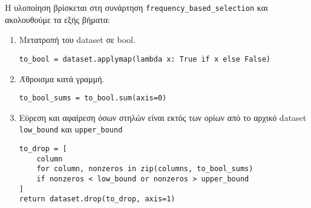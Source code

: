 Η υλοποίηση βρίσκεται στη συνάρτηση \lstinline!frequency_based_selection! και ακολουθούμε τα εξής βήματα:
\begin{enumerate}
\item Μετατροπή του dataset σε bool.
\begin{lstlisting}[numbers=none, aboveskip=\smallskipamount, belowskip=\smallskipamount, captionpos=none]
to_bool = dataset.applymap(lambda x: True if x else False)
\end{lstlisting}

\item Άθροισμα κατά γραμμή.
\begin{lstlisting}[numbers=none, aboveskip=\smallskipamount, belowskip=\smallskipamount, captionpos=none]
to_bool_sums = to_bool.sum(axis=0)
\end{lstlisting}

\item Εύρεση και αφαίρεση όσων στηλών είναι εκτός των ορίων από το αρχικό dataset \lstinline!low_bound! και \lstinline!upper_bound!
\begin{lstlisting}[numbers=none, aboveskip=\smallskipamount, belowskip=\smallskipamount, captionpos=none]
to_drop = [
    column
    for column, nonzeros in zip(columns, to_bool_sums)
    if nonzeros < low_bound or nonzeros > upper_bound
]
return dataset.drop(to_drop, axis=1)
\end{lstlisting}
\end{enumerate}